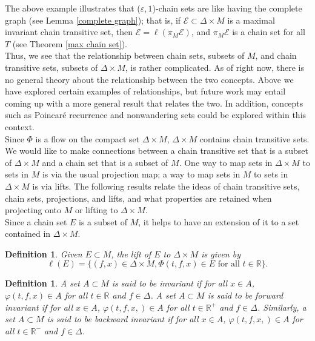 \documentclass[11pt]{article}
\newtheorem{defn}[thm]{Definition}
\begin{document}
The above example illustrates that ($\varepsilon,1$)-chain sets are like having the complete graph (see Lemma \ref{complete graph}); that is, if $\mathcal{E}\subset \Delta\times M$ is a maximal invariant chain transitive set, then $\mathcal{E}=\ell(\pi_M\mathcal{E})$, and $\pi_M\mathcal{E}$ is a chain set for all $T$ (see Theorem \ref{max chain set}).\\

\indent Thus, we see that the relationship between chain sets, subsets of $M$, and chain transitive sets, subsets of $\Delta\times M$, is rather complicated. As of right now, there is no general theory about the relationship between the two concepts.  Above we have explored certain examples of relationships, but future work may entail coming up with a more general result that relates the two.  In addition, concepts such as Poincar\'e recurrence and nonwandering sets could be explored within this context.  \\

Since $\Phi$ is a flow on the compact set $\Delta\times M$, $\Delta\times M$ contains chain transitive sets.  We would like to make connections between a chain transitive set that is a subset of $\Delta\times M$ and a chain set that is a subset of $M$.  One way to map sets in $\Delta\times M$ to sets in $M$ is via the usual projection map; a way to map sets in $M$ to sets in $\Delta\times M$ is via lifts.  The following results relate the ideas of chain transitive sets, chain sets, projections, and lifts, and what properties are retained when projecting onto $M$ or lifting to $\Delta\times M$. 
\\
\indent Since a chain set $E$ is a subset of $M$, it helps to have an extension of it to a set contained in $\Delta\times M$. 

\begin{defn}
Given $E\subset M$, the lift of $E$ to $\Delta\times M$ is given by
$$\ell(E)=\{(f,x)\in \Delta\times M,\Phi(t,f,x)\in E \text{ for all }t\in\mathbb{R}\}.$$
\end{defn}

\begin{defn}
A set $A\subset M$ is said to be invariant if for all $x\in A$, $\varphi(t,f,x)\in A$ for all $t\in\mathbb{R}$ and $f\in\Delta$.
A set $A\subset M$ is said to be forward invariant if for all $x\in A$, $\varphi(t,f,x,)\in A$ for all $t\in \mathbb{R}^+$ and $f\in\Delta$.  Similarly, a set $A\subset M$ is said to be backward invariant if for all $x\in A$, $\varphi(t,f,x,)\in A$ for all $t\in \mathbb{R}^-$ and $f\in\Delta$.
\end{defn}
\end{document}
